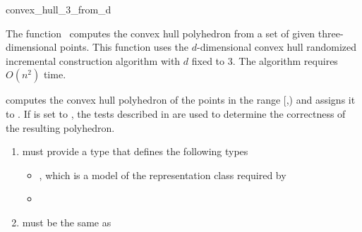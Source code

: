 

\begin{ccRefFunction}{convex_hull_3_from_d}  

\ccDefinition
  
The function \ccRefName\ computes the convex hull polyhedron from a set
of given three-dimensional points.  This function uses the $d$-dimensional
convex hull randomized incremental construction algorithm with $d$ fixed to 3.  
The algorithm requires $O(n^2)$ time.


            {computes the convex hull polyhedron 
            of the points in the range [,)
            and assigns it to .  If  is set to
            , the tests described in \cite{mnssssu-cgpvg-96} are
            used to determine the correctness of the resulting polyhedron.
            }

\begin{enumerate}
   \item    {} must provide a type 
            that defines the following types
             \begin{itemize}
               \item {}, which is a model of 
                     the representation class  required by
               \item {}
             \end{itemize}
   \item    {} must be the same as
\end{enumerate}


\end{ccRefFunction}

